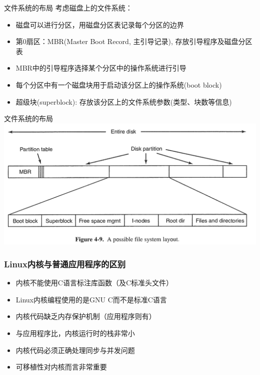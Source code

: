 \documentclass[xcolor=svgnames]{beamer}
\begin{document}
\begin{CJK*}{UTF8}{gbsn}
\begin{frame}{文件系统的布局}
考虑磁盘上的文件系统：
\begin{itemize}
\item 磁盘可以进行分区，用磁盘分区表记录每个分区的边界
\item 第0扇区：MBR(Master Boot Record, 主引导记录), 存放引导程序及磁盘分区表
\item MBR中的引导程序选择某个分区中的操作系统进行引导
\item 每个分区中有一个磁盘块用于启动该分区上的操作系统(boot block)
\item 超级块(superblock): 存放该分区上的文件系统参数(类型、块数等信息)
\end{itemize}
\end{frame}

\begin{frame}{文件系统的布局}
\includegraphics[width=1.0\textwidth]{layout.png}
\end{frame}

\begin{frame}[fragile]
\frametitle{Linux内核与普通应用程序的区别}
\begin{itemize}
\item 内核不能使用C语言标注库函数（及C标准头文件）
\item Linux内核编程使用的是GNU C而不是标准C语言
\item 内核代码缺乏内存保护机制（应用程序则有）
\item 与应用程序比，内核运行时的栈非常小
\item 内核代码必须正确处理同步与并发问题
\item 可移植性对内核而言非常重要
\end{itemize}
\end{frame}


\end{CJK*}
\end{document}
